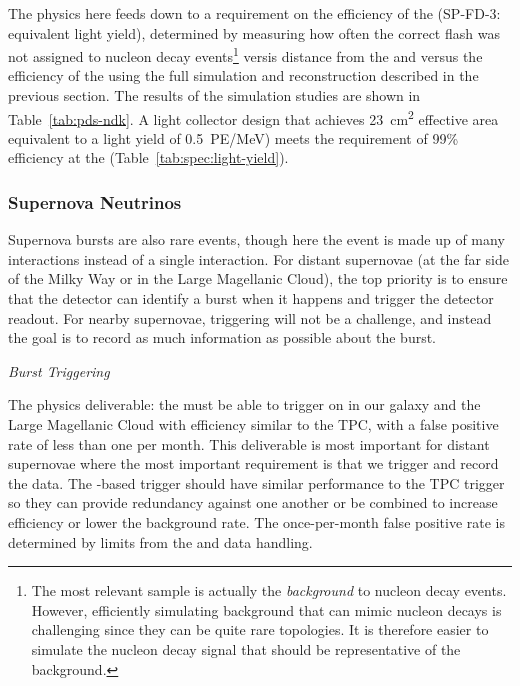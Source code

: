 The physics here feeds down to a requirement on the efficiency of the    (SP-FD-3: equivalent light yield), determined by measuring how often the correct flash was not assigned to nucleon decay 
events\footnote{The most relevant sample is actually the \textit{background} to nucleon decay events. However, efficiently simulating background that can mimic nucleon decays is challenging since they can be quite rare topologies. It is therefore easier to simulate the nucleon decay signal that should be representative of the background.} 
versis distance from the  and versus the efficiency of the  using the full simulation and reconstruction described in the previous section. The results of the simulation studies are shown in Table~\ref{tab:pds-ndk}. A light collector design that achieves \SI{23}{cm^2} effective area equivalent to a light yield of \SI{0.5}{PE/MeV}) meets the requirement of 99\% efficiency at the  (Table~\ref{tab:spec:light-yield}).


\subsubsection{Supernova Neutrinos}

Supernova bursts are also rare events, though here the event is made up of many interactions instead of a single interaction. For distant supernovae (at the far side of the Milky Way or in the Large Magellanic Cloud), the top priority is to ensure that the detector can identify a burst when it happens and trigger the detector readout. For nearby supernovae, triggering will not be a challenge, and instead the goal is to record as much information as possible about the burst.

\textit{Burst Triggering}

The physics deliverable: the  must be able to trigger on  in our galaxy and the Large Magellanic Cloud with efficiency similar to the TPC, with a false positive rate of less than one per month. This deliverable is most important for distant supernovae where the most important requirement is that we trigger and record the data. The -based trigger should have similar performance to the TPC trigger so they can provide redundancy against one another or be combined to increase efficiency or lower the background rate. The once-per-month false positive rate is determined by limits from the  and data handling.



